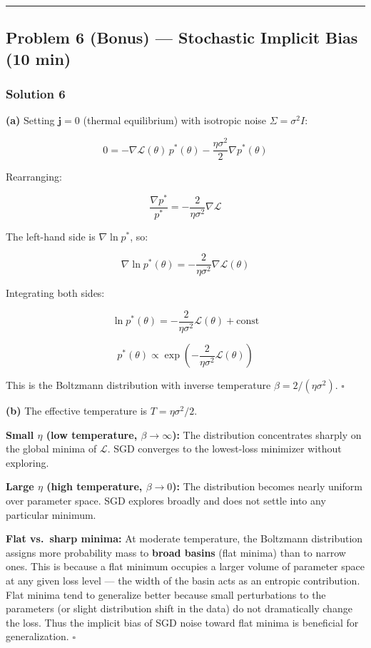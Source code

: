 \documentclass[
]{article}
\begin{document}
\begin{center}\rule{0.5\linewidth}{0.5pt}\end{center}

\subsection{Problem 6 (Bonus) --- Stochastic Implicit Bias (10
min)}\label{problem-6-bonus-stochastic-implicit-bias-10-min}

\subsubsection{Solution 6}\label{solution-6}

\textbf{(a)} Setting \(\mathbf{j} = 0\) (thermal equilibrium) with
isotropic noise \(\Sigma = \sigma^2 I\):

\[0 = -\nabla\mathcal{L}(\theta)\,p^*(\theta) - \frac{\eta\sigma^2}{2}\nabla p^*(\theta)\]

Rearranging:

\[\frac{\nabla p^*}{p^*} = -\frac{2}{\eta\sigma^2}\nabla\mathcal{L}\]

The left-hand side is \(\nabla\ln p^*\), so:

\[\nabla\ln p^*(\theta) = -\frac{2}{\eta\sigma^2}\nabla\mathcal{L}(\theta)\]

Integrating both sides:

\[\ln p^*(\theta) = -\frac{2}{\eta\sigma^2}\mathcal{L}(\theta) + \text{const}\]

\[\boxed{p^*(\theta) \propto \exp\!\left(-\frac{2}{\eta\sigma^2}\mathcal{L}(\theta)\right)}\]

This is the Boltzmann distribution with inverse temperature
\(\beta = 2/(\eta\sigma^2)\). \(\square\)

\textbf{(b)} The effective temperature is \(T = \eta\sigma^2/2\).

\textbf{Small \(\eta\) (low temperature, \(\beta \to \infty\)):} The
distribution concentrates sharply on the global minima of
\(\mathcal{L}\). SGD converges to the lowest-loss minimizer without
exploring.

\textbf{Large \(\eta\) (high temperature, \(\beta \to 0\)):} The
distribution becomes nearly uniform over parameter space. SGD explores
broadly and does not settle into any particular minimum.

\textbf{Flat vs.~sharp minima:} At moderate temperature, the Boltzmann
distribution assigns more probability mass to \textbf{broad basins}
(flat minima) than to narrow ones. This is because a flat minimum
occupies a larger volume of parameter space at any given loss level ---
the width of the basin acts as an entropic contribution. Flat minima
tend to generalize better because small perturbations to the parameters
(or slight distribution shift in the data) do not dramatically change
the loss. Thus the implicit bias of SGD noise toward flat minima is
beneficial for generalization. \(\square\)
\end{document}
